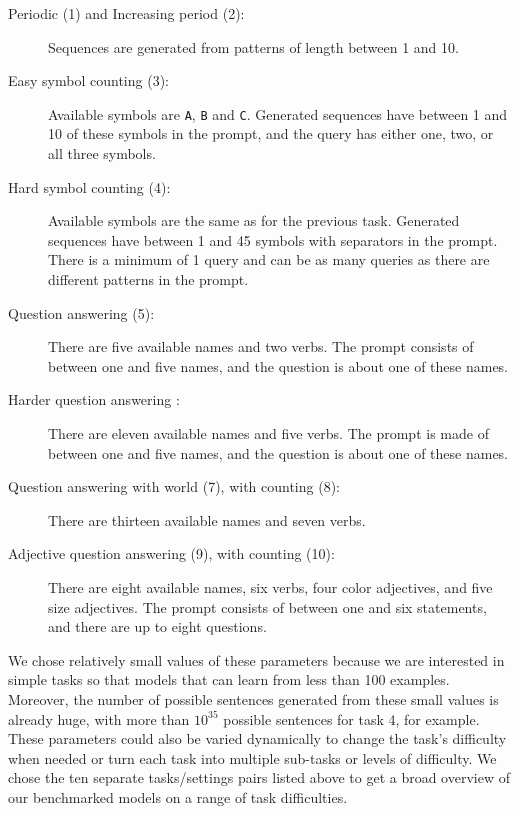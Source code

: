 \begin{description}
  \item[Periodic (1) and Increasing period (2):] Sequences are generated from patterns of
        length between 1 and 10.
  \item[Easy symbol counting (3):] Available symbols are \texttt{A}, \texttt{B} and
        \texttt{C}. Generated sequences have between 1 and 10 of these symbols
        in the prompt, and the query has either one, two, or all three symbols.
  \item[Hard symbol counting (4):] Available symbols are the same as for the previous
        task. Generated sequences have between 1 and 45 symbols
        with separators in the prompt. There is a minimum of 1 query and can be
        as many queries as there are different patterns in the prompt.
  \item[Question answering (5):] There are five available names and two verbs. The
        prompt consists of between one and five names, and the question is about one
        of these names.
  \item[Harder question answering :] There are eleven available names and five
        verbs. The prompt is made of between one and five names, and the
        question is about one of these names.
  \item[Question answering with world (7), with counting (8):] There are thirteen available
        names and seven verbs.
  \item[Adjective question answering (9), with counting (10):] There are eight
        available names, six verbs, four color adjectives, and five size
        adjectives. The prompt consists of between one and six statements, and
        there are up to eight questions.
\end{description}

We chose relatively small values of these parameters because we are interested in simple tasks
so that models that can learn from less than 100 examples. Moreover, the
number of possible sentences generated from these small values is already huge,
with more than $10^{35}$ possible sentences for task 4, for example. These
parameters could also be varied dynamically to change the task's difficulty when
needed or turn each task into multiple sub-tasks or levels of difficulty. We
chose the ten separate tasks/settings pairs listed above to get a broad overview of our
benchmarked models on a range of task difficulties.

